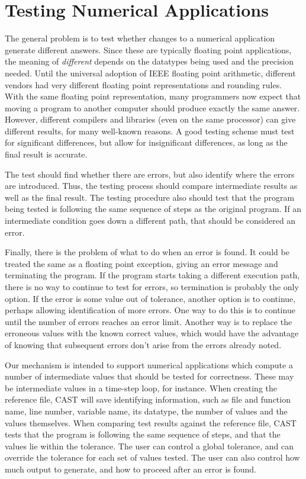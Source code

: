 \section{Testing Numerical Applications}

The general problem is to test whether changes to a numerical application generate different answers.
Since these are typically floating point applications, the meaning of \emph{different} depends on the datatypes being used and the precision needed.
Until the universal adoption of IEEE floating point arithmetic, different vendors had very different floating point representations and rounding rules.
With the same floating point representation, many programmers now expect that moving a program to another computer should produce exactly the same answer.
However, different compilers and libraries (even on the same processor) can give different results, for many well-known reasons.
A good testing scheme must test for significant differences, but allow for insignificant differences, as long as the final result is accurate.

The test should find whether there are errors, but also identify where the errors are introduced.
Thus, the testing process should compare intermediate results as well as the final result.
The testing procedure also should test that the program being tested is following the same sequence of steps as the original program.
If an intermediate condition goes down a different path, that should be considered an error.

Finally, there is the problem of what to do when an error is found.
It could be treated the same as a floating point exception, giving an error message and terminating the program.
If the program starts taking a different execution path, there is no way to continue to test for errors, so termination is probably the only option.
If the error is some value out of tolerance, another option is to continue, perhaps allowing identification of more errors.
One way to do this is to continue until the number of errors reaches an error limit.
Another way is to replace the erroneous values with the known correct values, which would have the advantage of knowing that subsequent errors don't arise from the errors already noted.

Our mechanism is intended to support numerical applications which compute a number of intermediate values that should be tested for correctness.
These may be intermediate values in a time-step loop, for instance.
When creating the reference file, CAST will save identifying information, such as file and function name, line number, variable name, its datatype, the number of values and the values themselves.
When comparing test results against the reference file, CAST tests that the program is following the same sequence of steps, and that the values lie within the tolerance.
The user can control a global tolerance, and can override the tolerance for each set of values tested.
The user can also control how much output to generate, and how to proceed after an error is found.

